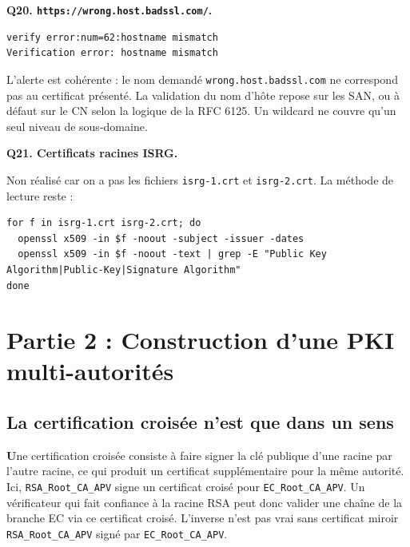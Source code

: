 \documentclass[11pt,a4paper]{article}
\newcommand{\tri}{\texttt{APV}}
\begin{document}
\textbf{Q20. \texttt{https://wrong.host.badssl.com/}.}
\begin{lstlisting}[style=out]
verify error:num=62:hostname mismatch
Verification error: hostname mismatch
\end{lstlisting}
\begin{reponse}
L'alerte est cohérente : le nom demandé \texttt{wrong.host.badssl.com} ne correspond pas
au certificat présenté. La validation du nom d'hôte repose sur les SAN, ou à défaut sur
le CN selon la logique de la RFC 6125. Un wildcard ne couvre qu'un seul niveau de
sous-domaine.
\end{reponse}

\textbf{Q21. Certificats racines ISRG.}
\begin{reponse}
Non réalisé car on a pas les fichiers \texttt{isrg-1.crt} et \texttt{isrg-2.crt}. La méthode de lecture reste :
\begin{lstlisting}[style=cmd]
for f in isrg-1.crt isrg-2.crt; do
  openssl x509 -in $f -noout -subject -issuer -dates
  openssl x509 -in $f -noout -text | grep -E "Public Key Algorithm|Public-Key|Signature Algorithm"
done
\end{lstlisting}
\end{reponse}

\newpage
\section{Partie 2 : Construction d'une PKI multi-autorités}

\subsection{La certification croisée n'est que dans un sens}
\begin{reponse}
\textbf Une certification croisée consiste à
faire signer la clé publique d'une racine par l'autre racine, ce qui produit un
certificat supplémentaire pour la même autorité. Ici, \texttt{RSA\_Root\_CA\_\tri}
signe un certificat croisé pour \texttt{EC\_Root\_CA\_\tri}. Un vérificateur qui fait
confiance à la racine RSA peut donc valider une chaîne de la branche EC via ce certificat
croisé. L'inverse n'est pas vrai sans certificat miroir
\texttt{RSA\_Root\_CA\_\tri} signé par \texttt{EC\_Root\_CA\_\tri}.
\end{reponse}
\end{document}

